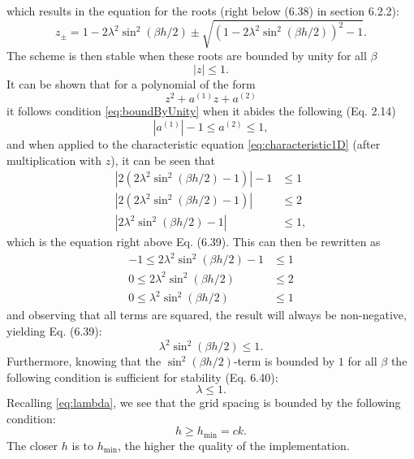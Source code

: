 \documentclass{article}
\begin{document}
which results in the equation for the roots (right below (6.38) in section 6.2.2):
\begin{equation}
    z_\pm = 1-2\lambda^2\sin^2(\beta h/2) \pm \sqrt{(1 - 2\lambda^2\sin^2(\beta h/2))^2 - 1}.
\end{equation}
The scheme is then stable when these roots are bounded by unity for all $\beta$ \cite{BilbaoTutorial2018}
\begin{equation}\label{eq:boundByUnity}
    |z| \leq 1.
\end{equation} 
It can be shown that for a polynomial of the form 
\begin{equation}\label{eq:polynomialForm}
    z^2 + a^{(1)}z + a^{(2)}
\end{equation} it follows condition \eqref{eq:boundByUnity} when it abides the following (Eq. 2.14)
\begin{equation}\label{eq:condition214}
    |a^{(1)}| - 1 \leq a^{(2)} \leq 1,
\end{equation}
and when applied to the characteristic equation \eqref{eq:characteristic1D} (after multiplication with $z$), it can be seen that
\begin{equation}\nonumber
    \begin{aligned}
        |2(2\lambda^2\sin^2(\beta h/2) - 1)|-1 &\leq 1\\
        |2(2\lambda^2\sin^2(\beta h/2) - 1)| &\leq 2\\
        |2\lambda^2\sin^2(\beta h/2) - 1| &\leq 1,
    \end{aligned}    
\end{equation}
which is the equation right above Eq. (6.39). This can then be rewritten as
\begin{equation}\nonumber
    \begin{aligned}
        -1 \leq 2\lambda^2\sin^2(\beta h/2) - 1 &\leq 1\\
        0 \leq 2\lambda^2\sin^2(\beta h/2)&\leq 2\\
        0\leq \lambda^2\sin^2(\beta h/2) &\leq 1
    \end{aligned}
\end{equation}
and observing that all terms are squared, the result will always be non-negative, yielding Eq. (6.39):
\begin{equation}
     \lambda^2\sin^2(\beta h/2) \leq 1.
\end{equation}
Furthermore, knowing that the $\sin^2(\beta h / 2)$-term is bounded by $1$ for all $\beta$ the following condition is sufficient for stability (Eq. 6.40):
\begin{equation}
    \lambda \leq 1.
\end{equation}
Recalling \eqref{eq:lambda}, we see that the grid spacing is bounded by the following condition:
\begin{equation}
    h \geq h_\text{min} = ck.
\end{equation}
The closer $h$ is to $h_\text{min}$, the higher the quality of the implementation. 
\end{document}
